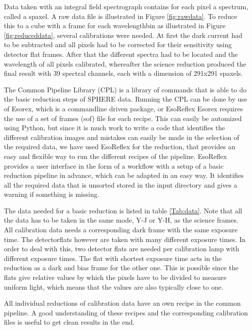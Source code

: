 \documentclass[twoside,single]{lion-msc}
\begin{document}
Data taken with an integral field spectrograph contains for each pixel a spectrum, called a spaxel. A raw data file is illustrated in Figure \ref{fig:rawdata}. To reduce this to a cube with a frame for each wavelengthbin as illustrated in Figure \ref{fig:reduceddata}, several calibrations were needed. At first the dark current had to be subtracted and all pixels had to be corrected for their sensitivity using detector flat frames. After that the different spectra had to be located and the wavelength of all pixels calibrated, whereafter the science reduction produced the final result with 39 spectral channels, each with a dimension of 291x291 spaxels.
\bigskip

The Common Pipeline Library (CPL)\citep{Observatory2007} is a library of commands that is able to do the basic reduction steps of SPHERE data. Running the CPL can be done by use of Esorex, which is a commandline driven package, or EsoReflex  Esorex requires the use of a set of frames (sof) file for each recipe. This can easily be automized using Python, but since it is much work to write a code that identifies the different calibration images and mistakes can easily be made in the selection of the required data, we have used EsoReflex for the reduction, that provides an easy and flexible way to run the different recipes of the pipeline. EsoReflex provides a user interface in the form of a workflow with a setup of a basic reduction pipeline in advance, which can be adapted in an easy way. It identifies all the required data that is unsorted stored in the input directory and gives a warning if something is missing. 
\bigskip

The data needed for a basic reduction is listed in table \ref{Tab:data}. Note that all the data has to be taken in the same mode, Y-J or Y-H, as the science frames. All calibration data needs a corresponding dark frame with the same exposure time. The detectorflats however are taken with many different exposure times. In order to deal with this, two detector flats are needed per calibration lamp with different exposure times. The flat with shortest exposure time acts in the reduction as a dark and bias frame for the other one. This is possible since the flats give relative values by which the pixels have to be divided to measure uniform light, which means that the values are also typically close to one. 
\bigskip

All individual reductions of calibration data have an own recipe in the common pipeline. A good understanding of these recipes and the corresponding calibration files is useful to get clean results in the end.
\end{document}
